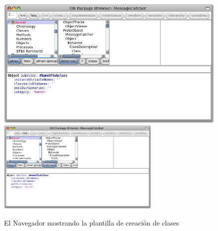 \documentclass[a4paper,10pt,twoside]{book}
\begin{document}
\begin{figure}[htbp]
   \centering
   \ifluluelse
	   {\includegraphics[width=\textwidth]{SystemBrowserClassCreation}}
	   {\includegraphics[width=0.7\textwidth]{SystemBrowserClassCreation}}
   \caption{El Navegador mostrando la plantilla de creaci\'on de clases
   }
\end{figure}
\end{document}
